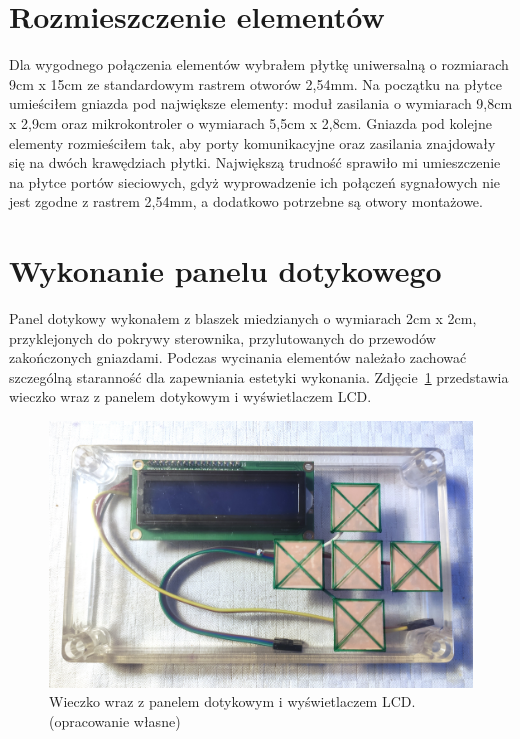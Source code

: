 \documentclass[11pt]{report}
\begin{document}
 \section{Rozmieszczenie elementów}
 Dla wygodnego połączenia elementów wybrałem płytkę uniwersalną o rozmiarach 9cm x 15cm ze standardowym rastrem otworów 2,54mm.
 Na początku na płytce umieściłem gniazda pod największe elementy: moduł zasilania o wymiarach 9,8cm x 2,9cm oraz mikrokontroler o wymiarach 5,5cm x 2,8cm. Gniazda pod kolejne elementy rozmieściłem tak, aby porty komunikacyjne oraz zasilania znajdowały się na dwóch krawędziach płytki. 
 Największą trudność sprawiło mi umieszczenie na płytce portów sieciowych, gdyż wyprowadzenie ich połączeń sygnałowych nie jest zgodne z rastrem 2,54mm, a dodatkowo potrzebne są otwory montażowe.
  
  \section{Wykonanie panelu dotykowego}
 Panel dotykowy wykonałem z blaszek miedzianych o wymiarach 2cm x 2cm, przyklejonych do pokrywy sterownika, przylutowanych do przewodów zakończonych gniazdami. Podczas wycinania elementów należało zachować szczególną staranność dla zapewniania estetyki wykonania.
  Zdjęcie~\ref{fig:wieczko} przedstawia wieczko wraz z panelem dotykowym i wyświetlaczem LCD.
\begin{figure}[ht]
\centering
\includegraphics[width=0.8 \textwidth]{fig/wieczko.jpg}
\caption{Wieczko wraz z panelem dotykowym i wyświetlaczem LCD. (opracowanie własne)}
\label{fig:wieczko}
\end{figure}
\end{document}
